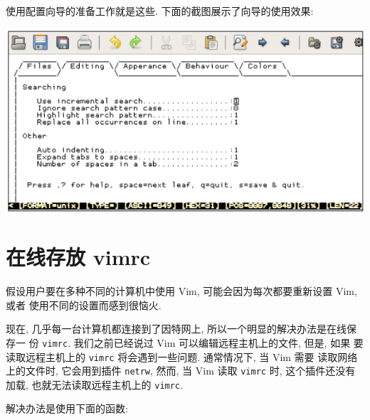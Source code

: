 使用配置向导的准备工作就是这些. 下面的截图展示了向导的使用效果:
\begin{center}
\includegraphics[scale=0.7]{./images/page221.png}
\end{center}

\section{在线存放 vimrc}
\label{sec:storing_vimrc_online}

假设用户要在多种不同的计算机中使用 Vim, 可能会因为每次都要重新设置 Vim, 或者
使用不同的设置而感到很恼火.

现在, 几乎每一台计算机都连接到了因特网上, 所以一个明显的解决办法是在线保存一
份 \texttt{vimrc}. 我们之前已经说过 Vim 可以编辑远程主机上的文件, 但是, 如果
要读取远程主机上的 \texttt{vimrc} 将会遇到一些问题. 通常情况下, 当 Vim 需要
读取网络上的文件时, 它会用到插件 \texttt{netrw}, 然而, 当 Vim 读取
\texttt{vimrc} 时, 这个插件还没有加载, 也就无法读取远程主机上的 \texttt{vimrc}.

解决办法是使用下面的函数:
